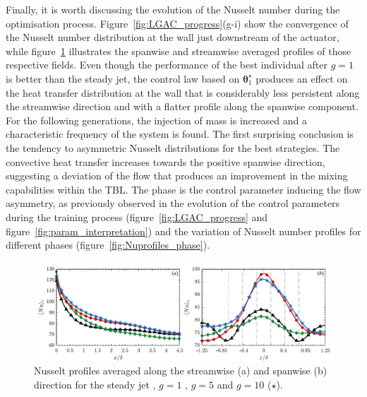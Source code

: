 Finally, it is worth discussing the evolution of the Nusselt number during the optimisation process. Figure~\ref{fig:LGAC_progress}(g-i) show the convergence of the Nusselt number distribution at the wall just downstream of the actuator, while figure~\ref{fig:Nuprofiles} illustrates the spanwise and streamwise averaged profiles of those respective fields. Even though the performance of the best individual after $g=1$ is better than the steady jet, the control law based on $\bm{\theta}_1^\star$ produces an effect on the heat transfer distribution at the wall that is considerably less persistent along the streamwise direction and with a flatter profile along the spanwise component. For the following generations, the injection of mass is increased and a characteristic frequency of the system is found. The first surprising conclusion is the tendency to asymmetric Nusselt distributions for the best strategies. The convective heat transfer increases towards the positive spanwise direction, suggesting a deviation of the flow that produces an improvement in the mixing capabilities within the TBL. The phase is the control parameter inducing the flow asymmetry, as previously observed in the evolution of the control parameters during the training process (figure~\ref{fig:LGAC_progress} and figure~\ref{fig:param_interpretation}) and the variation of Nusselt number profiles for different phases (figure~\ref{fig:Nuprofiles_phase}). 
\begin{figure} %
    \centering
    \includegraphics[width=0.99\linewidth]{figures/F10.pdf}
    \caption{Nusselt profiles averaged along the streamwise (a) and spanwise (b) direction for the steady jet , $g = 1$ , $g = 5$  and $g = 10$ ({\color{blue_lgac}$\star$}).}
    \label{fig:Nuprofiles}
\end{figure}

